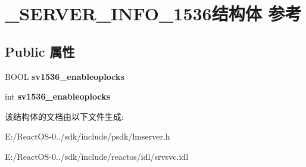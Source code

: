 \hypertarget{struct___s_e_r_v_e_r___i_n_f_o__1536}{}\section{\+\_\+\+S\+E\+R\+V\+E\+R\+\_\+\+I\+N\+F\+O\+\_\+1536结构体 参考}
\label{struct___s_e_r_v_e_r___i_n_f_o__1536}
\subsection*{Public 属性}
\begin{DoxyCompactItemize}
\item 
\mbox{\label{struct___s_e_r_v_e_r___i_n_f_o__1536_a38d0776ff06991535754774c0cb45eac}} 
B\+O\+OL {\bfseries sv1536\+\_\+enableoplocks}
\item 
\mbox{\label{struct___s_e_r_v_e_r___i_n_f_o__1536_aaea814aa8fa75ef8013557f3f06b7fba}} 
int {\bfseries sv1536\+\_\+enableoplocks}
\end{DoxyCompactItemize}


该结构体的文档由以下文件生成\+:\begin{DoxyCompactItemize}
\item 
E\+:/\+React\+O\+S-\/0../sdk/include/psdk/lmserver.\+h\item 
E\+:/\+React\+O\+S-\/0../sdk/include/reactos/idl/srvsvc.\+idl\end{DoxyCompactItemize}
